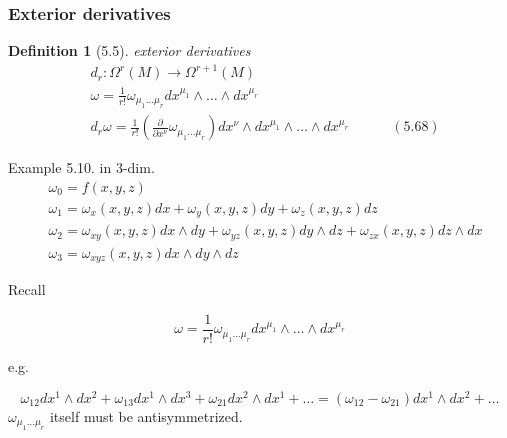 \documentclass[twoside]{amsart}
\newtheorem{definition}{Definition}
\begin{document}
\subsubsection{ Exterior derivatives }

\begin{definition}[5.5] exterior derivatives 
\[
\begin{aligned}
  & d_r : \Omega^r(M) \to \Omega^{r+1}(M) \\ 
  & \omega = \frac{1}{r!} \omega_{ \mu_1 \dots \mu_r} dx^{\mu_1} \wedge \dots \wedge dx^{\mu_r} \\  
  & d_r \omega = \frac{1}{r!} \left( \frac{ \partial }{ \partial x^{\nu }} \omega_{\mu_1 \dots \mu_r} \right) dx^{\nu} \wedge dx^{\mu_1} \wedge \dots \wedge dx^{\mu_r} \quad \quad \quad (5.68)
\end{aligned}
\]
\end{definition}


Example 5.10.  in 3-dim. 
\[
\begin{aligned}
  & \omega_0 = f(x,y,z) \\ 
  & \omega_1 = \omega_x(x,y,z) dx + \omega_y(x,y,z)dy + \omega_z(x,y,z) dz \\ 
  & \omega_2 = \omega_{xy}(x,y,z) dx \wedge dy + \omega_{yz}(x,y,z) dy \wedge dz + \omega_{zx}(x,y,z) dz \wedge dx \\ 
  & \omega_3 = \omega_{xyz}(x,y,z) dx \wedge dy \wedge dz
\end{aligned}
\]

Recall

\[
\omega = \frac{1}{r!} \omega_{ \mu_1 \dots \mu_r} dx^{\mu_1} \wedge \dots \wedge dx^{\mu_r}
\]

e.g.

\[
\omega_{12} dx^1 \wedge dx^2 + \omega_{13} dx^1 \wedge dx^3 + \omega_{21} dx^2 \wedge dx^1 + \dots = (\omega_{12} - \omega_{21} ) dx^1 \wedge dx^2 + \dots 
\]
$\omega_{\mu_1 \dots \mu_r}$ itself must be antisymmetrized. 
\end{document}
